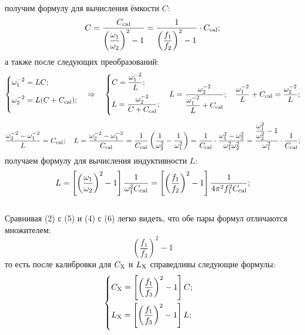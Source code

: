 \documentclass[12pt,a4paper]{article}
\newcommand{\ds}{\displaystyle}
\newcommand{\cc}{C_{\rm cal}}
\newcommand{\cx}{C_{\rm X}}
\newcommand{\lx}{L_{\rm X}}
\begin{document}
	получим формулу для вычисления ёмкости $C$: \\
	\begin{equation}
		\ds C = \frac{\cc}{{\left(\ds\frac{\omega_1}{\omega_2}\right)}^2-1} =
		\frac{1}{{\left(\ds\frac{f_1}{f_2}\right)}^2-1}\cdot\cc;
	\end{equation}
	а также после следующих преобразований: \\
	\begin{equation*}
		\begin{cases}
			\ds \omega_1^{-2} = LC; \\[9pt]
			\ds \omega_2^{-2} = L(C+\cc); \\[9pt]
		\end{cases} \Rightarrow \quad
		\begin{cases}
			\ds C = \frac{\omega_1^{-2}}{L}; \\[9pt]
			\ds L = \frac{\omega_2^{-2}}{C+\cc}; \\[9pt]
		\end{cases}
		\ds L = \frac{\omega_2^{-2}}{\ds\frac{\omega_1^{-2}}{L}+\cc}; \quad
		\frac{\omega_1^{-2}}{L}+\cc = \frac{\omega_2^{-2}}{L};
	\end{equation*}
	\begin{equation*}
		\ds \frac{\omega_2^{-2}-\omega_1^{-2}}{L} = \cc; \quad
		L = \frac{\omega_2^{-2}-\omega_1^{-2}}{\cc} = 
		\frac{1}{\cc}\left(\frac{1}{\omega_2^2}-\frac{1}{\omega_1^2}\right) =
		\frac{1}{\cc}\cdot\frac{\omega_1^2-\omega_2^2}{\omega_1^2\omega_2^2} =
		\frac{\ds\frac{\omega_1^2}{\omega_2^2}-1}{\omega_1^2}\cdot\frac{1}{\cc};
	\end{equation*}
	получаем формулу для вычисления индуктивности $L$: \\
	\begin{equation}
		\ds L = \left[{\left(\frac{\omega_1}{\omega_2}\right)}^2-1\right]\frac{1}{\omega_1^2\cc} =
		\left[{\left(\frac{f_1}{f_2}\right)}^2-1\right]\frac{1}{4\pi^2f_1^2\cc};
	\end{equation}
	\\
	Сравнивая (2) с (5) и (4) с (6) легко видеть, 
	что обе пары формул отличаются множителем: \\
	\begin{equation*}
		\ds {\left(\frac{f_1}{f_3}\right)}^2 - 1
	\end{equation*}
	то есть после калибровки для $\cx$ и $\lx$ справедливы следующие формулы:
	\begin{equation} 
		\begin{cases}
			\ds \cx = \left[{\left(\frac{f_1}{f_3}\right)}^2 - 1\right]C; \\[12pt]
			\ds \lx = \left[{\left(\frac{f_1}{f_3}\right)}^2 - 1\right]L; \\[12pt]
		\end{cases}
	\end{equation}
\end{document}
